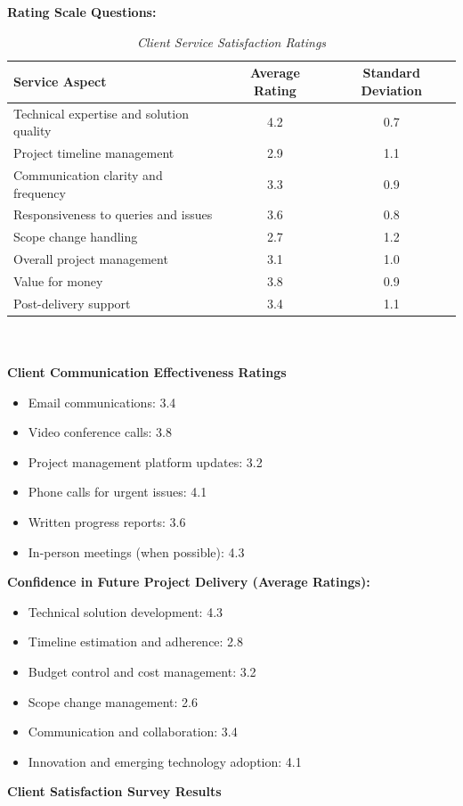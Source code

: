 \documentclass[12pt,a4paper,oneside]{book}
\begin{document}
\newpage
\textbf{Rating Scale Questions:}
\begin{table}[h!]
\centering
\caption{\textit{Client Service Satisfaction Ratings}}
\begin{tabular}{|l|c|c|}
\hline
Service Aspect & Average Rating & Standard Deviation \\
\hline
Technical expertise and solution quality & 4.2 & 0.7 \\
Project timeline management & 2.9 & 1.1 \\
Communication clarity and frequency & 3.3 & 0.9 \\
Responsiveness to queries and issues & 3.6 & 0.8 \\
Scope change handling & 2.7 & 1.2 \\
Overall project management & 3.1 & 1.0 \\
Value for money & 3.8 & 0.9 \\
Post-delivery support & 3.4 & 1.1 \\
\hline
\end{tabular}
\end{table}\\
\\
\textbf{Client Communication Effectiveness Ratings}\\
\begin{itemize}
  \item Email communications: 3.4
  \item Video conference calls: 3.8
  \item Project management platform updates: 3.2
  \item Phone calls for urgent issues: 4.1
  \item Written progress reports: 3.6
  \item In-person meetings (when possible): 4.3\\
\end{itemize}

\textbf{Confidence in Future Project Delivery (Average Ratings):}\\
\begin{itemize}
  \item Technical solution development: 4.3
  \item Timeline estimation and adherence: 2.8
  \item Budget control and cost management: 3.2
  \item Scope change management: 2.6
  \item Communication and collaboration: 3.4
  \item Innovation and emerging technology adoption: 4.1\\
\end{itemize}
\newpage
\textbf{Client Satisfaction Survey Results}\\
\end{document}
